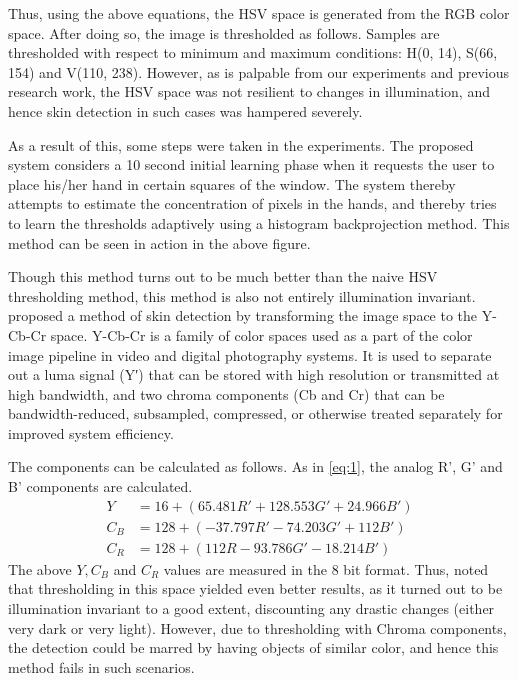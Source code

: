 \documentclass[letterpaper, 10 pt, twoside, conference]{ieeeconf}
\begin{document}
Thus, using the above equations, the HSV space is generated from the RGB color space.
After doing so, the image is thresholded as follows. Samples are thresholded with respect
to minimum and maximum conditions: H(0, 14), S(66, 154) and V(110, 238).
However, as is palpable from our experiments and previous research work, the HSV space
was not resilient to changes in illumination, and hence skin detection in such cases
was hampered severely.

As a result of this, some steps were taken in the experiments. The proposed system considers
a 10 second initial learning phase when it requests the user to place his/her hand in certain
squares of the window. The system thereby attempts to estimate the concentration of pixels in the
hands, and thereby tries to learn the thresholds adaptively using a histogram backprojection method.
This method can be seen in action in the above figure. 

Though this method turns out to be much better than the naive HSV thresholding method, this method is
also not entirely illumination invariant. \cite{Chai1999} proposed a method of skin detection by transforming
the image space to the Y-Cb-Cr space. Y-Cb-Cr is a family of color spaces used as a part of the color image
pipeline in video and digital photography systems. It is used to separate out a luma signal (Y′) that can be 
stored with high resolution or transmitted at high bandwidth, and two chroma components (Cb and Cr) 
that can be bandwidth-reduced, subsampled, compressed, or otherwise treated separately for improved system efficiency.

The components can be calculated as follows. As in \ref{eq:1}, the analog R', G' and B' components are calculated.
\[
  \begin{split}
    Y &= 16 + (65.481R' + 128.553G' + 24.966B')
    \\
    C_B &= 128 + (-37.797R' - 74.203G' + 112B')
    \\
    C_R &= 128 + (112R - 93.786G' - 18.214B')
  \end{split}
\]
The above $Y,C_B$ and $C_R$ values are measured in the 8 bit format. Thus, \cite{Chai1999} noted that thresholding
in this space yielded even better results, as it turned out to be illumination invariant to a good extent,
discounting any drastic changes (either very dark or very light). However, due to thresholding with Chroma
components, the detection could be marred by having objects of similar color, and hence this method fails
in such scenarios. 
\end{document}
